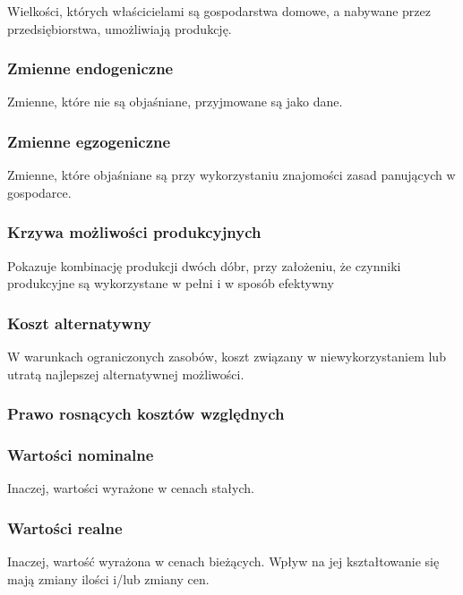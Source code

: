 \documentclass[a4paper,12pt]{article}
\begin{document}
Wielkości, których właścicielami są gospodarstwa domowe, a nabywane przez przedsiębiorstwa, umożliwiają produkcję.

\subsubsection*{Zmienne endogeniczne}

Zmienne, które nie są objaśniane, przyjmowane są jako dane.

\subsubsection*{Zmienne egzogeniczne}

Zmienne, które objaśniane są przy wykorzystaniu znajomości zasad panujących w gospodarce.

\subsubsection*{Krzywa możliwości produkcyjnych}

Pokazuje kombinację produkcji dwóch dóbr, przy założeniu, że czynniki produkcyjne są wykorzystane w pełni i w sposób efektywny

\subsubsection*{Koszt alternatywny}

W warunkach ograniczonych zasobów, koszt związany w niewykorzystaniem lub utratą najlepszej alternatywnej możliwości.

\subsubsection*{Prawo rosnących kosztów względnych}

\subsubsection*{Wartości nominalne}

Inaczej, wartości wyrażone w cenach stałych.

\subsubsection*{Wartości realne}

Inaczej, wartość wyrażona w cenach bieżących. Wpływ na jej kształtowanie się mają zmiany ilości i/lub zmiany cen.
\end{document}
